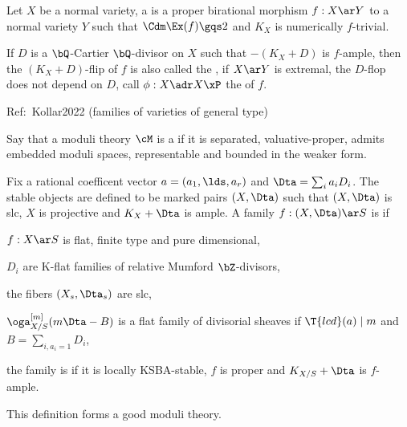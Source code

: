 \documentclass[article, a4paper, twoside]{universal}
\begin{document}
\begin{dfn}[Flop, 6.10]
	Let $X$ be a normal variety, a  is a proper birational morphism $f:X\ar Y$ to a normal variety $Y$ such that $\Cdm\Ex(f)\gqs2$ and $K_{X}$ is numerically $f$-trivial.

	If $D$ is a $\bQ$-Cartier $\bQ$-divisor on $X$ such that $-(K_{X}+D)$ is $f$-ample, then the $(K_{X}+D)$-flip of $f$ is also called the , if $X\ar Y$ is extremal, the $D$-flop does not depend on $D$, call $\phi:X\adr X\xP$ the  of $f$.
\end{dfn}

Ref:~Kollar2022 (families of varieties of general type)

\begin{dfn}
	Say that a moduli theory $\cM$ is a  if it is separated, valuative-proper, admits embedded moduli spaces, representable and bounded in the weaker form.
\end{dfn}


\begin{thm}[8.6, 8.7, 8.9]
	Fix a rational coefficent vector $a=(a_{1},\lds,a_{r})$ and $\Dta=\sum_{i}a_{i}D_{i}$. The stable objects are defined to be marked pairs $(X,\Dta)$ such that $(X,\Dta)$ is slc, $X$ is projective and $K_{X}+\Dta$ is ample. A family $f:(X,\Dta)\ar S$ is  if
	\begin{itm}
		\item $f:X\ar S$ is flat, finite type and pure dimensional,
		\item $D_{i}$ are K-flat families of relative Mumford $\bZ$-divisors,
		\item the fibers $(X_{s},\Dta_{s})$ are slc,
		\item $\oga_{X/S}^{[m]}(m\Dta-B)$ is a flat family of divisorial sheaves if $\T{lcd}(a)\mid m$ and $B=\sum_{i, a_{i}=1}D_{i}$,
	\end{itm}
	the family is  if it is locally KSBA-stable, $f$ is proper and $K_{X/S}+\Dta$ is $f$-ample.

	This definition forms a good moduli theory.
\end{thm}
\end{document}
